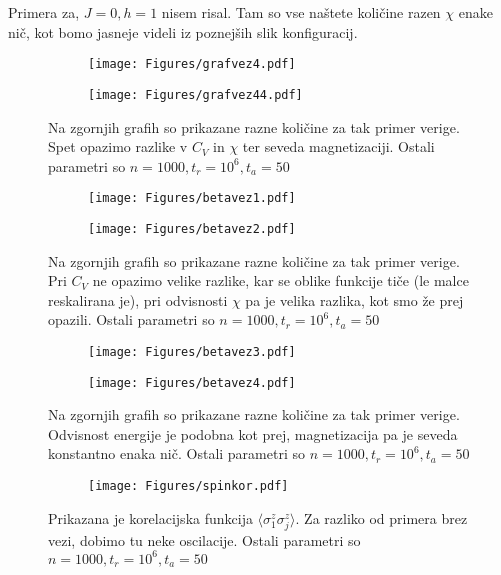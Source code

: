 \documentclass{article}
\begin{document}
Primera za, $J=0,h=1$ nisem risal. Tam so vse naštete količine razen $\chi$ enake nič, kot bomo jasneje videli iz poznejših slik konfiguracij.

\begin{figure}[H]
\centering
\begin{subfigure}{.49\textwidth}
\texttt{[image: Figures/grafvez4.pdf]}
\end{subfigure}
\begin{subfigure}{.49\textwidth}
\texttt{[image: Figures/grafvez44.pdf]}
\end{subfigure}
\caption*{Na zgornjih grafih so prikazane razne količine za tak primer verige. Spet opazimo razlike v $C_V$ in $\chi$ ter seveda magnetizaciji.  Ostali parametri so $n=1000, t_r=10^6, t_a=50$}
\end{figure}

\begin{figure}[H]
\centering
\begin{subfigure}{.49\textwidth}
\texttt{[image: Figures/betavez1.pdf]}
\end{subfigure}
\begin{subfigure}{.49\textwidth}
\texttt{[image: Figures/betavez2.pdf]}
\end{subfigure}
\caption*{Na zgornjih grafih so prikazane razne količine za tak primer verige. Pri $C_V$ ne opazimo velike razlike, kar se oblike funkcije tiče (le malce reskalirana je), pri odvisnosti $\chi$ pa je velika razlika, kot smo že prej opazili. Ostali parametri so $n=1000, t_r=10^6, t_a=50$}
\end{figure}

\begin{figure}[H]
\centering
\begin{subfigure}{.49\textwidth}
\texttt{[image: Figures/betavez3.pdf]}
\end{subfigure}
\begin{subfigure}{.49\textwidth}
\texttt{[image: Figures/betavez4.pdf]}
\end{subfigure}
\caption*{Na zgornjih grafih so prikazane razne količine za tak primer verige. Odvisnost energije je podobna kot prej, magnetizacija pa je seveda konstantno enaka nič. Ostali parametri so $n=1000, t_r=10^6, t_a=50$}
\end{figure}

\begin{figure}[H]
\centering
\begin{subfigure}{.8\textwidth}
\texttt{[image: Figures/spinkor.pdf]}
\end{subfigure}
\caption*{Prikazana je korelacijska funkcija $\langle \sigma_1^z \sigma_j^z \rangle$. Za razliko od primera brez vezi, dobimo tu neke oscilacije. Ostali parametri so $n=1000, t_r=10^6, t_a=50$}
\end{figure}
\end{document}
